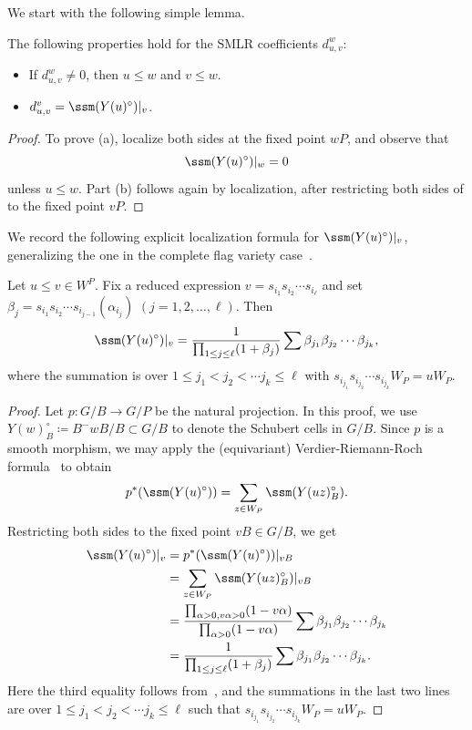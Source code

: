 We start with the following simple lemma.
\begin{lemma}\label{lem:CSMLR} The following properties hold
	for the SMLR coefficients $d_{u,v}^w$: 
	\begin{center}
		\begin{itemize}
			\item[(a)] If $d_{u,v}^{w}\neq 0$, then $u\leq w$
			and $v\leq w$.
			\item[(b)] $d_{u,v}^{v}= \ssm({Y(u)^\circ})|_v$.
		\end{itemize}
	\end{center}
\end{lemma}
\begin{proof} To prove (a), localize both sides at the fixed point $wP$, and observe
	that \[ \ssm({Y(u)^\circ})|_{w}=0 \] unless $u\leq w$. Part (b) follows again by localization, 
	after restricting both sides of  to the fixed point $vP$.
\end{proof}

We record the following explicit localization formula for $\ssm({Y(u)^\circ})|_v$, generalizing the one in the complete flag variety case~\cite[Corollary 9.8]{AMSS:shadows}.
\begin{prop}\label{prop:loc}
	Let $u\leq v\in W^P$.
	Fix a reduced expression $v=s_{i_1} s_{i_2} \cdots s_{i_\ell}$
	and set $\beta_j=s_{i_1} s_{i_2} \cdots s_{i_{j-1}}(\alpha_{i_j})$
	$(j=1,2,\ldots,\ell)$.
	Then
	$$\ssm (Y(u)^\circ)|_v=\frac{1}{\prod_{1\leq j\leq \ell}(1+\beta_j)}
	\sum \beta_{j_1}\beta_{j_2}\cdots \beta_{j_k},$$
	where the summation is over $ 1\leq j_1<j_2<\cdots j_k\leq \ell$ with 
	$s_{i_{j_1}}s_{i_{j_2}}\cdots s_{i_{j_k}}W_P=uW_P$.
\end{prop} 
\begin{proof}
	Let $p:G/B\rightarrow G/P$ be the natural projection. In this proof, 
	we use $Y(w)^\circ_B\coloneqq B^-wB/B\subset G/B$ to denote the Schubert cells in $G/B$. 
	Since $p$ is a smooth morphism, we may apply the (equivariant) 
		Verdier-Riemann-Roch formula~\cite[Theorem 4.1]{ohmoto:eqcsm} to obtain
	\[p^*(\ssm (Y(u)^\circ))=\sum_{z\in W_P}\ssm (Y(uz)_B^\circ).\]
	Restricting both sides to the fixed point $vB\in G/B$, we get
	\begin{align*}
		\ssm (Y(u)^\circ)|_{v}&=p^*(\ssm (Y(u)^\circ))|_{vB}\\
		&=\sum_{z\in W_P}\ssm (Y(uz)_B^\circ)|_{vB}\\
		&=\frac{\prod_{\alpha>0,v\alpha>0}(1-v\alpha)}{\prod_{\alpha>0}(1-v\alpha)}\sum \beta_{j_1}\beta_{j_2}\cdots \beta_{j_k}\\
		&=\frac{1}{\prod_{1\leq j\leq \ell}(1+\beta_j)}
		\sum \beta_{j_1}\beta_{j_2}\cdots \beta_{j_k}.
	\end{align*}
	Here the third equality follows from~\cite[Corollary 6.7]{AMSS:shadows}, and the summations in the last two lines are over $ 1\leq j_1<j_2<\cdots j_k\leq \ell$ such that 
	$s_{i_{j_1}}s_{i_{j_2}}\cdots s_{i_{j_k}}W_P=uW_P$.
\end{proof}

